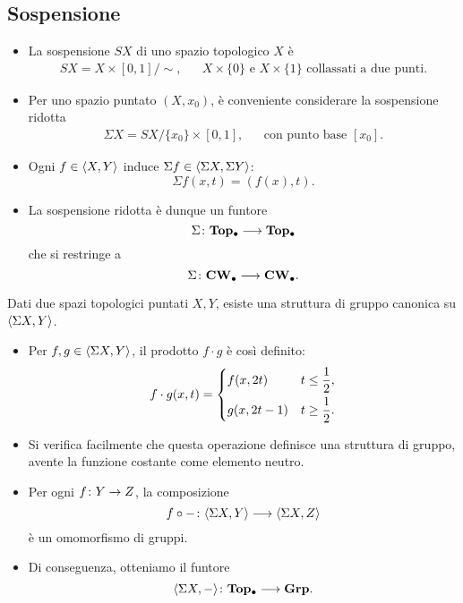 \subsection*{Sospensione}
\begin{frame*}
\begin{itemize}
\item La sospensione $SX$ di uno spazio topologico $X$ è
\begin{align*}
SX=X\times[0,1]/\sim,&&\text{$X\times\{0\}$ e $X\times\{1\}$ collassati a due punti.}
\end{align*}
\item Per uno spazio puntato $(X,x_0)$, è conveniente considerare la sospensione ridotta
\begin{align*}
\Sigma X=SX/\{x_0\}\times[0,1],&&\text{con punto base $[x_0]$.}
\end{align*}
\item Ogni $f\in\langle X,Y\rangle$ induce $\Sigma f\in\langle \Sigma X,\Sigma Y\rangle$:
\[
\Sigma f(x,t)=(f(x),t).
\]
\item La sospensione ridotta è dunque un funtore
\[
\map{\Sigma}{\Top0}{\Top0}
\]
che si restringe a
\[
\map{\Sigma}{\CW0}{\CW0}.
\]
\end{itemize}
\end{frame*}

\begin{frame*}
Dati due spazi topologici puntati $X,Y$, esiste una struttura di gruppo canonica su $\langle \Sigma X,Y\rangle$.
\begin{itemize}
\item Per $f,g\in\langle \Sigma X,Y\rangle$, il prodotto $f\cdot g$ è così definito:
\[
f\cdot g(x,t)=\begin{dcases}f(x,2t)&t\le\frac{1}{2},\\g(x,2t-1)&t\ge\frac{1}{2}.\end{dcases}
\]
\item Si verifica facilmente che questa operazione definisce una struttura di gruppo, avente la funzione costante come elemento neutro.
\item Per ogni $\map{f}{Y}{Z}$, la composizione
\[
\map{f\circ-{}}{\hmaps{\Sigma X,Y}}{\hmaps{\Sigma X,Z}}
\]
 è un omomorfismo di gruppi.
 \item Di conseguenza, otteniamo il funtore
 \[
 \map{\hmaps{\Sigma X,-}}{\Top0}{\Grp}.
 \]
\end{itemize}
\end{frame*}

